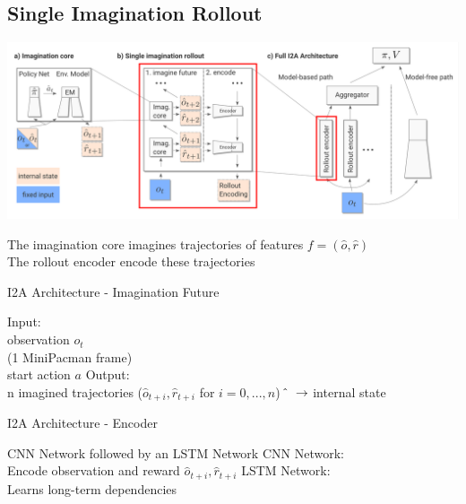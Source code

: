  
 
\subsection{Single Imagination Rollout}
 
 
\includegraphics[width=\columnwidth]{./Images/i2a_all_imagination_rollout.png}%
 
The imagination core imagines trajectories of features $f = (\hat{o}, \hat{r})$\\ 
The rollout encoder encode these trajectories     
 
 
 
I2A Architecture - Imagination Future 
 
Input:\\ 
    observation $o_t$ \\ 
    (1 MiniPacman frame)\\ 
    start action $a$ 
Output:\\ 
    n imagined trajectories ($\hat{o}_{t+i}, \hat{r}_{t+i}$ for $i = 0, ..., n$) 
     $\hat{} \hspace{2mm} \rightarrow$ internal state 
   
 
I2A Architecture - Encoder 
 
     CNN Network followed by an LSTM Network 
    CNN Network:\\ 
    Encode observation and reward $\hat{o}_{t+i}, \hat{r}_{t+i}$ 
    LSTM Network:\\ 
    Learns long-term dependencies 
   
